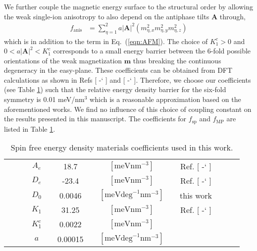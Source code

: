 \documentclass[%
 reprint,
superscriptaddress,
 amsmath,amssymb,
prb,
]{revtex4-1}
\newcommand*{\citen}[1]{%
  \begingroup
    \romannumeral-`\x %
    \setcitestyle{numbers}%
    \cite{#1}%
  \endgroup   
}
\begin{document}
%
We further couple the magnetic energy surface to the structural order by allowing the weak single-ion anisotropy to also depend on the antiphase tilts $\mathbf{A}$ \cite{Weingart2012} through,
%
\begin{equation}\label{eqn:anis}
\begin{aligned}
    f_\mathrm{anis} &=  \sum\limits_{\eta = 1}^2 a|\textbf{A}|^2\left(m_{\eta,x}^2 m_{\eta,y}^2 m_{\eta,z}^2\right)
\end{aligned}
\end{equation}
%
which is in addition to the term in Eq.~(\ref{eqn:AFM}).
%
The choice of $K_1^c > 0$ and $0 < a |\textbf{A}|^2 < K_1^c$ corresponds to a small energy barrier between the 6-fold possible orientations of the weak magnetization $\mathbf{m}$ thus breaking the continuous degeneracy in the easy-plane. %
%
These coefficients can be obtained from DFT calculations as shown in Refs [\citen{Dixit2015}] and [\citen{Weingart2012}].
%
Therefore, we choose our coefficients (see Table \ref{tab:spincoeff}) such that the relative energy density barrier for the six-fold symmetry is 0.01 meV/$\mathrm{nm}^3$ which is a reasonable approximation based on the aforementioned works.
%
We find no influence of this choice of coupling constant on the results presented in this manuscript.
%
%
The coefficients for $f_\mathrm{sp}$ and $f_\mathrm{MP}$ are listed in Table \ref{tab:spincoeff}.
%
\begin{table}[h!]%
\caption{\label{tab:spincoeff}%
Spin free energy density materials coefficients used in this work.
}
\begin{ruledtabular}
\begin{tabular}{c c c c c c c c c c c c c    }
 & & & $A_e$ & & 18.7 & & $[\mathrm{meV} \mathrm{nm}^{-3}]$ & & Ref. [\citen{Agbelele2017}] & &  &     \\ 
 & & & $D_e$ & & -23.4 & & $[\mathrm{meV} \mathrm{nm}^{-3}]$ & & Ref. [\citen{Xu2019}] & &  &     \\ 
 & & & $D_0$ & & 0.0046 & & $[\mathrm{meV} \mathrm{deg}^{-1} \mathrm{nm}^{-3}]$  & & this work & &  &     \\ 
 & & & $K_1$ & & 31.25 & & $[\mathrm{meV} \mathrm{nm}^{-3}]$ & & Ref. [\citen{Dixit2015}] & &  &     \\ 
 & & & $K_1^c$ & & 0.0022 & & $[\mathrm{meV} \mathrm{nm}^{-3}]$ & &  & &  &     \\ 
 & & & $a$ & & 0.00015 & & $[\mathrm{meV} \mathrm{deg}^{-1} \mathrm{nm}^{-3}]$ & &  & &  &     \\ 
\end{tabular}
\end{ruledtabular}
\end{table}
%
\end{document}
